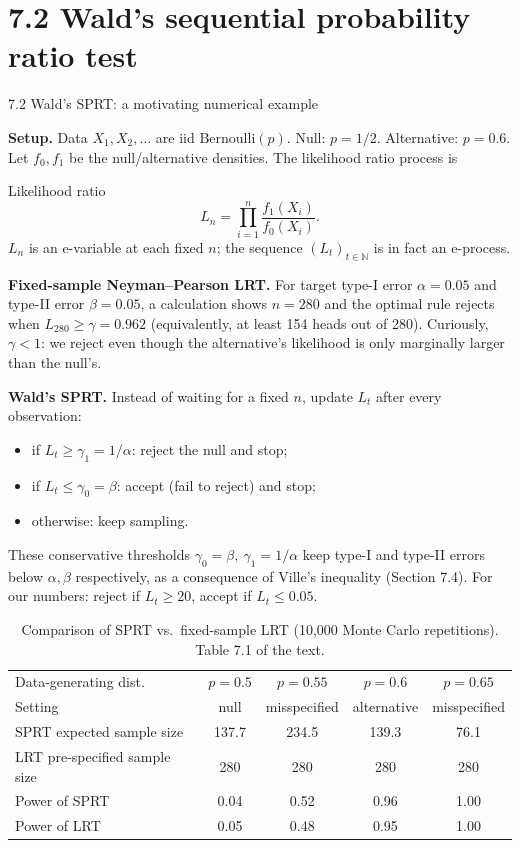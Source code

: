 \documentclass[aspectratio=169,10pt]{beamer}
\newcommand{\Nmb}{\mathbb{N}}
\begin{document}
\section{7.2 Wald's sequential probability ratio test}

\begin{frame}[allowframebreaks]{7.2 Wald's SPRT: a motivating numerical example}

\textbf{Setup.} Data $X_1, X_2, \dots$ are iid $\text{Bernoulli}(p)$. Null: $p = 1/2$. Alternative: $p = 0.6$. Let
$f_0, f_1$ be the null/alternative densities. The likelihood ratio process is
\begin{block}{Likelihood ratio}
$$L_n = \prod_{i=1}^n \frac{f_1(X_i)}{f_0(X_i)}.$$
$L_n$ is an e-variable at each fixed $n$; the sequence $(L_t)_{t\in\Nmb}$ is in fact an e-process.
\end{block}

\textbf{Fixed-sample Neyman--Pearson LRT.} For target type-I error $\alpha=0.05$ and type-II error $\beta=0.05$, a
calculation shows $n=280$ and the optimal rule rejects when $L_{280} \ge \gamma = 0.962$ (equivalently, at least
154 heads out of 280). Curiously, $\gamma < 1$: we reject even though the alternative's likelihood is only
marginally larger than the null's.

\textbf{Wald's SPRT.} Instead of waiting for a fixed $n$, update $L_t$ after every observation:
\begin{itemize}
\item if $L_t \ge \gamma_1 = 1/\alpha$: reject the null and stop;
\item if $L_t \le \gamma_0 = \beta$: accept (fail to reject) and stop;
\item otherwise: keep sampling.
\end{itemize}
These conservative thresholds $\gamma_0=\beta,\ \gamma_1=1/\alpha$ keep type-I and type-II errors below $\alpha,\beta$
respectively, as a consequence of Ville's inequality (Section 7.4). For our numbers: reject if $L_t \ge 20$, accept
if $L_t \le 0.05$.

\framebreak

\begin{table}
\centering
\scriptsize
\begin{tabular}{lcccc}
\toprule
Data-generating dist. & $p=0.5$ & $p=0.55$ & $p=0.6$ & $p=0.65$ \\
Setting & null & misspecified & alternative & misspecified \\
\midrule
SPRT expected sample size & 137.7 & 234.5 & 139.3 & 76.1 \\
LRT pre-specified sample size & 280 & 280 & 280 & 280 \\
Power of SPRT & 0.04 & 0.52 & 0.96 & 1.00 \\
Power of LRT & 0.05 & 0.48 & 0.95 & 1.00 \\
\bottomrule
\end{tabular}
\caption{\scriptsize Comparison of SPRT vs.\ fixed-sample LRT (10,000 Monte Carlo repetitions). Table 7.1 of the text.}
\end{table}


\end{frame}
\end{document}
